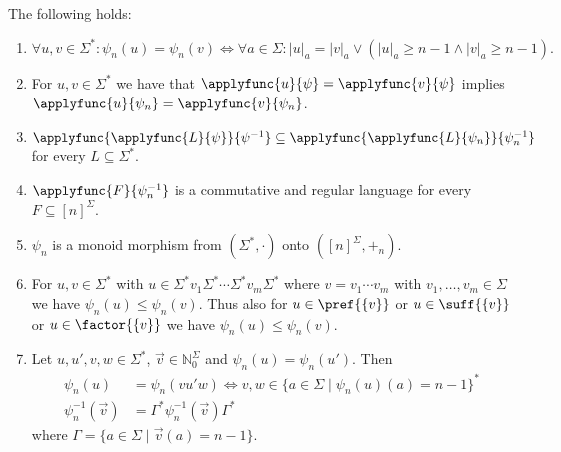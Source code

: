\begin{proposition} \label{constrsync:comm:prop:croppedmap} The following holds:
	\begin{enumerate}		
		\item \label{constrsync:comm:prop:croppedmap:1}
		$\forall u,v \in \Sigma^* \colon 
				\psi_n(u) = \psi_n(v)  \Leftrightarrow \forall a \in \Sigma \colon |u|_a = |v|_a \lor ( |u|_a \ge n-1 \land |v|_a \ge n-1 ).			
		$
				
		\item \label{item:psi_n} For $u,v \in \Sigma^*$ we have that $\applyfunc{u}{\psi} = \applyfunc{v}{\psi}$ implies $\applyfunc{u}{\psi_n} = \applyfunc{v}{\psi_n}$.
		
		\item \label{constrsync:comm:prop:croppedmap:2} $\applyfunc{\applyfunc{L}{\psi}}{\psi^{-1}} 
		\subseteq 
		\applyfunc{\applyfunc{L}{\psi_n}}{\psi_n^{-1}}$   for every $L \subseteq \Sigma^*$.
		
		\item  \label{constrsync:comm:prop:croppedmap:3} $\applyfunc{F}{\psi_n^{-1}}$
		is a commutative and regular language for every $F \subseteq [n]^{\Sigma}$.
			
		\item  \label{constrsync:comm:prop:croppedmap:4} $\psi_n$ is a monoid morphism from $(\Sigma^*, \cdot)$ onto $([n]^{\Sigma}, +_n)$. 
			
		\item \label{constrsync:comm:prop:croppedmap:4a} For $u, v \in \Sigma^*$ with 
		$u \in \Sigma^* v_1 \Sigma^* \cdots \Sigma^* v_m \Sigma^*$
		where $v = v_1 \cdots v_m$ with $v_1, \ldots, v_m \in \Sigma$
		we have $\psi_n(u) \le \psi_n(v)$.		
		Thus also for 	$u \in \pref{\{v\}}$
		or
		$u \in \suff{\{v\}}$
		or
		$u \in \factor{\{v\}}$
		we have $\psi_n(u) \le \psi_n(v)$.	
		
	\item  \label{constrsync:comm:prop:croppedmap:5} Let $u,u',v,w \in \Sigma^*$, $\vec{v} \in \mathbb N_0^{\Sigma}$ and $\psi_n(u) = \psi_n(u')$. Then	
	\begin{align}
		\psi_n(u)            & = \psi_n(vu'w) \Leftrightarrow v,w \in \{ a \in \Sigma \mid \psi_n(u)(a) = n - 1\}^* \label{constrsync:eqn:psinuvw} \\
		\psi_n^{-1}(\vec{v}) & = \Gamma^* \psi_n^{-1}(\vec{v}) \Gamma^*
	\end{align}
	 where $\Gamma = \{ a \in \Sigma \mid \vec{v}(a) = n - 1 \}$. %
	\end{enumerate}  
\end{proposition}
